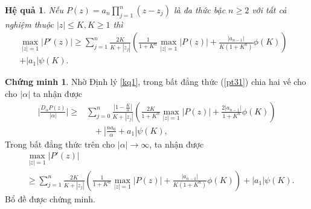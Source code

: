 \documentclass[a5paper,12pt]{report}
\theoremstyle{definition}
\newtheorem*{chungminh}{Chứng minh}
\newtheorem{hequa}[dinhly]{Hệ quả}
\newcommand{\cm}{\begin{chungminh}}
\newcommand{\hcm}{\end{chungminh}}
\newcommand{\hq}{\begin{hequa}\itshape}
\newcommand{\hhq}{\end{hequa}}
\numberwithin{equation}{chapter}
\def\vt{\vert}
\def\vt{\vert}
\def\vt{\vert}
\begin{document}
	\hq \label{hq2} Nếu $P(z)=a_n\prod_{j=1}^n(z-z_j)$ là đa thức bậc $n \ge 2$ với tất cả nghiệm thuộc $|z|\le K, K\ge 1$ thì
	$$\begin{aligned} \max\limits_{\vt z\vt=1}|P'(z)|
		\ge\sum_{j=1}^n \frac{2K}{K+|z_j|}\left(\frac{1}{1+K^n}\max\limits_{\vt z\vt=1} |P(z)| +\frac{|a_{n-1}|}{K(1+K^n)}\phi(K)\right) & \\+|a_1|\psi(K).
	\end{aligned}
	$$
	\hhq
	\cm Nhờ Định lý \ref{kq1}, trong bất đẳng thức (\ref{pt31}) chia hai vế cho
	cho $\vert \alpha\vert$ ta nhận được
	$$\begin{aligned}
		\Big\vt \frac{D_\alpha P(z)}{\vt \alpha\vt}\Big\vt \ge & \sum_{j=0}^n\frac{\left|1-\frac{K}{\alpha}\right|}{K+|z_j|}\left(\frac{2K}{1+K^n}\underset{|z|=1}{\max}|P(z)|
		+\frac{2|a_{n-1}|}{1+K^n}\phi(K)\right)
		\\&\;\;\; +\left|\frac{na_0}{\alpha}+a_1\right|\psi(K),
	\end{aligned}
	$$
	Trong bất đẳng thức trên cho $\vt \alpha\vt \to \infty$, ta nhận được
	$$\begin{aligned} & \max\limits_{\vt z\vt=1}|P'(z)|
		\\& \ge \sum_{j=1}^n \frac{2K}{K+|z_j|}\left(\frac{1}{1+K^n}\max\limits_{\vt z\vt=1} |P(z)| +\frac{|a_{n-1}|}{K(1+K^n)}\phi(K)\right)+|a_1|\psi(K).
	\end{aligned}
	$$
	Bổ đề được chứng minh.
	\hcm
	
\end{document}
